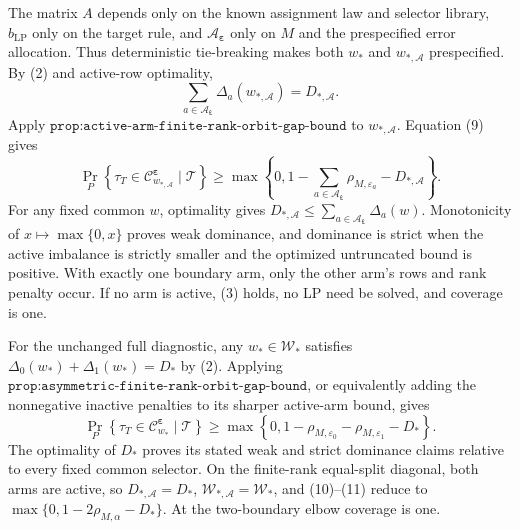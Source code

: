 The matrix \(A\) depends only on the known assignment law and selector library, \(b_{\mathrm{LP}}\) only on the target rule, and \(\mathcal A_{\boldsymbol\varepsilon}\) only on \(M\) and the prespecified error allocation. Thus deterministic tie-breaking makes both \(w_*\) and \(w_{*,\mathcal A}\) prespecified. By (2) and active-row optimality,
\[
\sum_{a\in\mathcal A_{\boldsymbol\varepsilon}}\Delta_a(w_{*,\mathcal A})=D_{*,\mathcal A}.
\tag{9}
\]
Apply \(\texttt{prop:active-arm-finite-rank-orbit-gap-bound}\) to \(w_{*,\mathcal A}\). Equation (9) gives
\[
\Pr_P\!\left\{\tau_T\in\mathcal C^{\boldsymbol\varepsilon}_{w_{*,\mathcal A}}\mid\mathcal T\right\}\ge\max\!\left\{0,1-\sum_{a\in\mathcal A_{\boldsymbol\varepsilon}}\rho_{M,\varepsilon_a}-D_{*,\mathcal A}\right\}.
\tag{10}
\]
For any fixed common \(w\), optimality gives \(D_{*,\mathcal A}\le\sum_{a\in\mathcal A_{\boldsymbol\varepsilon}}\Delta_a(w)\). Monotonicity of \(x\mapsto\max\{0,x\}\) proves weak dominance, and dominance is strict when the active imbalance is strictly smaller and the optimized untruncated bound is positive. With exactly one boundary arm, only the other arm's rows and rank penalty occur. If no arm is active, (3) holds, no LP need be solved, and coverage is one.

For the unchanged full diagnostic, any \(w_*\in\mathcal W_*\) satisfies \(\Delta_0(w_*)+\Delta_1(w_*)=D_*\) by (2). Applying \(\texttt{prop:asymmetric-finite-rank-orbit-gap-bound}\), or equivalently adding the nonnegative inactive penalties to its sharper active-arm bound, gives
\[
\Pr_P\!\left\{\tau_T\in\mathcal C^{\boldsymbol\varepsilon}_{w_*}\mid\mathcal T\right\}\ge\max\!\left\{0,1-\rho_{M,\varepsilon_0}-\rho_{M,\varepsilon_1}-D_*\right\}.
\tag{11}
\]
The optimality of \(D_*\) proves its stated weak and strict dominance claims relative to every fixed common selector. On the finite-rank equal-split diagonal, both arms are active, so \(D_{*,\mathcal A}=D_*\), \(\mathcal W_{*,\mathcal A}=\mathcal W_*\), and (10)--(11) reduce to \(\max\{0,1-2\rho_{M,\alpha}-D_*\}\). At the two-boundary elbow coverage is one.